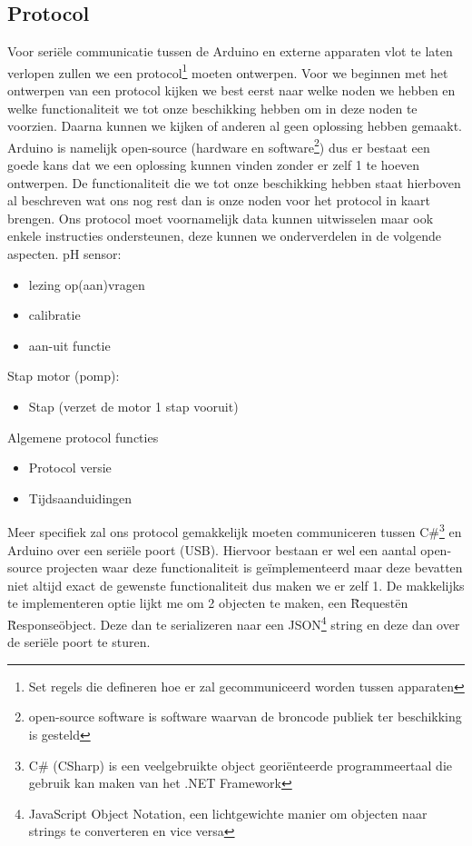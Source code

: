 \documentclass[10pt,twoside]{report}
\newcommand{\pbr}{\hfill\break\hfill\break}
\begin{document}
\subsection{Protocol}
Voor seriële communicatie tussen de Arduino en externe apparaten vlot te laten verlopen zullen we een protocol\footnote{Set regels die defineren hoe er zal gecommuniceerd worden tussen apparaten} moeten ontwerpen.
Voor we beginnen met het ontwerpen van een protocol kijken we best eerst naar welke noden we hebben en welke functionaliteit we tot onze beschikking hebben om in deze noden te voorzien. Daarna kunnen we kijken of anderen al geen oplossing hebben gemaakt. Arduino is namelijk open-source (hardware en software\footnote{open-source software is software waarvan de broncode publiek ter beschikking is gesteld}) dus er bestaat een goede kans dat we een oplossing kunnen vinden zonder er zelf 1 te hoeven ontwerpen. De functionaliteit die we tot onze beschikking hebben staat hierboven al beschreven wat ons nog rest dan is onze noden voor het protocol in kaart brengen.
\pbr
Ons protocol moet voornamelijk data kunnen uitwisselen maar ook enkele instructies ondersteunen, deze kunnen we onderverdelen in de volgende aspecten.
\pbr
pH sensor:
\begin{itemize}
    \item lezing op(aan)vragen
    \item calibratie
    \item aan-uit functie
\end{itemize}
Stap motor (pomp):
\begin{itemize}
    \item Stap (verzet de motor 1 stap vooruit)
\end{itemize}
Algemene protocol functies
\begin{itemize}
    \item Protocol versie
    \item Tijdsaanduidingen
\end{itemize}
Meer specifiek zal ons protocol gemakkelijk moeten communiceren tussen C\#\footnote{C\# (CSharp) is een veelgebruikte object georiënteerde programmeertaal die gebruik kan maken van het .NET Framework} en Arduino over een seriële poort (USB). Hiervoor bestaan er wel een aantal open-source projecten waar deze functionaliteit is geïmplementeerd maar deze bevatten niet altijd exact de gewenste functionaliteit dus maken we er zelf 1.
\pbr
De makkelijks te implementeren optie lijkt me om 2 objecten te maken, een \"Request\" en \"Response\" object. Deze dan te serializeren naar een JSON\footnote{JavaScript Object Notation, een lichtgewichte manier om objecten naar strings te converteren en vice versa} string en deze dan over de seriële poort te sturen.
\end{document}
